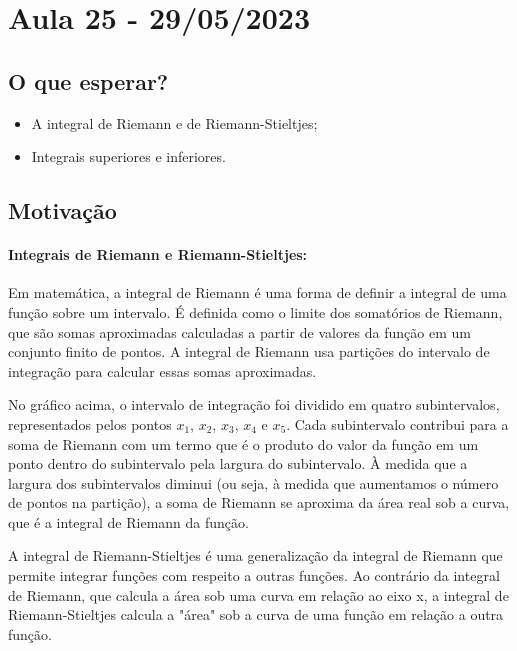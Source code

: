 \documentclass[analysis_notes.tex]{subfiles}
\begin{document}
\section{Aula 25 - 29/05/2023}
\subsection{O que esperar?}
\begin{itemize}
	\item A integral de Riemann e de Riemann-Stieltjes;
	\item Integrais superiores e inferiores.
\end{itemize}
\subsection{Motiva\c cão}
\paragraph{Integrais de Riemann e Riemann-Stieltjes:}
Em matemática, a integral de Riemann é uma forma de definir a integral de uma
função sobre um intervalo. É definida como o limite dos somatórios de Riemann,
que são somas aproximadas calculadas a partir de valores da função em um
conjunto finito de pontos. A integral de Riemann usa partições do intervalo
de integração para calcular essas somas aproximadas.


No gráfico acima, o intervalo de integração foi dividido em quatro subintervalos,
representados pelos pontos $x_1$, $x_2$, $x_3$, $x_4$ e $x_5$.
Cada subintervalo contribui para a soma de Riemann com um termo que é o
produto do valor da função em um ponto dentro do subintervalo pela largura do
subintervalo. À medida que a largura dos subintervalos diminui (ou seja, à
medida que aumentamos o número de pontos na partição), a soma de Riemann se
aproxima da área real sob a curva, que é a integral de Riemann da função.

A integral de Riemann-Stieltjes é uma generalização da integral de Riemann
que permite integrar funções com respeito a outras funções. Ao contrário da
integral de Riemann, que calcula a área sob uma curva em relação ao eixo x,
a integral de Riemann-Stieltjes calcula a "área" sob a curva de uma função em
relação a outra função.
\end{document}
